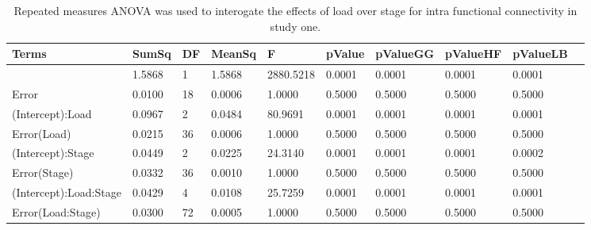 \begin{table}
\centering
\begin{tabular}[0.2em]{@{}llllllllll@{}}\toprule
Terms & SumSq & DF & MeanSq & F & pValue & pValueGG & pValueHF & pValueLB\\\toprule[0.2em]
(Intercept) & 1.5868 & 1 & 1.5868 & 2880.5218 & 0.0001 & 0.0001 & 0.0001 & 0.0001 \\\midrule
Error & 0.0100 & 18 & 0.0006 & 1.0000 & 0.5000 & 0.5000 & 0.5000 & 0.5000 \\\midrule
(Intercept):Load & 0.0967 & 2 & 0.0484 & 80.9691 & 0.0001 & 0.0001 & 0.0001 & 0.0001 \\\midrule
Error(Load) & 0.0215 & 36 & 0.0006 & 1.0000 & 0.5000 & 0.5000 & 0.5000 & 0.5000 \\\midrule
(Intercept):Stage & 0.0449 & 2 & 0.0225 & 24.3140 & 0.0001 & 0.0001 & 0.0001 & 0.0002 \\\midrule
Error(Stage) & 0.0332 & 36 & 0.0010 & 1.0000 & 0.5000 & 0.5000 & 0.5000 & 0.5000 \\\midrule
(Intercept):Load:Stage & 0.0429 & 4 & 0.0108 & 25.7259 & 0.0001 & 0.0001 & 0.0001 & 0.0001 \\\midrule
Error(Load:Stage) & 0.0300 & 72 & 0.0005 & 1.0000 & 0.5000 & 0.5000 & 0.5000 & 0.5000 \\\bottomrule[0.2em]
\end{tabular}
\caption{Repeated measures ANOVA was used to interogate the effects of load over stage for intra functional connectivity in study one.\label{tabel:tbl_RMAAFC1}}
\end{table}
